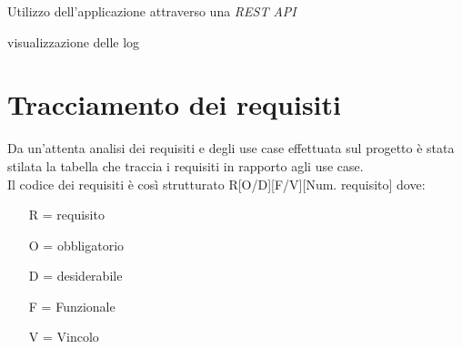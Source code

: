 \begin{usecase}{8}{Utilizzo dell'applicazione attraverso una \textit{REST API}}
    \label{uc:8}
\end{usecase}

\begin{usecase}{9}{visualizzazione delle log}
    \label{uc:9}
\end{usecase}

\section{Tracciamento dei requisiti}

Da un'attenta analisi dei requisiti e degli use case effettuata sul progetto è stata stilata la tabella che traccia i requisiti in rapporto agli use case.\\
Il codice dei requisiti è così strutturato R[O/D][F/V][Num. requisito] dove:
\begin{enumerate}
	\item[R =] requisito
    \item[O =] obbligatorio
    \item[D =] desiderabile
    \item[F =] Funzionale
    \item[V =] Vincolo 
\end{enumerate}

